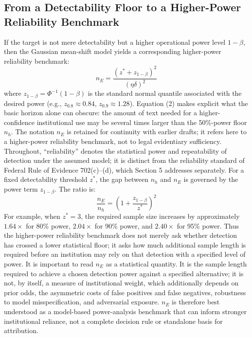 \documentclass[11pt]{article}
\begin{document}
\subsection{From a Detectability Floor to a Higher-Power Reliability Benchmark}
If the target is not mere detectability but a higher operational power level
$1-\beta$, then the Gaussian mean-shift model yields a corresponding higher-power
reliability benchmark:
\begin{equation}
n_E = \frac{(z^* + z_{1-\beta})^2}{(\eta\delta)^2}
\end{equation}
where $z_{1-\beta} = \Phi^{-1}(1-\beta)$ is the standard normal quantile associated
with the desired power (e.g., $z_{0.8} \approx 0.84$, $z_{0.9} \approx 1.28$).
Equation (2) makes explicit what the basic horizon alone can obscure: the amount of
text needed for a higher-confidence institutional use may be several times larger
than the 50\%-power floor $n_h$. The notation $n_E$ is retained for continuity with
earlier drafts; it refers here to a higher-power reliability benchmark, not to legal
evidentiary sufficiency. Throughout, ``reliability'' denotes the statistical power
and repeatability of detection under the assumed model; it is distinct from the
reliability standard of Federal Rule of Evidence 702(c)--(d), which Section 5
addresses separately.
For a fixed detectability threshold $z^*$, the gap between $n_h$ and $n_E$ is
governed by the power term $z_{1-\beta}$. The ratio is:
\begin{equation}
\frac{n_E}{n_h} = \left(1 + \frac{z_{1-\beta}}{z^*}\right)^2
\end{equation}
For example, when $z^* = 3$, the required sample size increases by approximately
$1.64\times$ for 80\% power, $2.04\times$ for 90\% power, and $2.40\times$ for 95\%
power. Thus the higher-power reliability benchmark does not merely ask whether
detection has crossed a lower statistical floor; it asks how much additional sample
length is required before an institution may rely on that detection with a
specified level of power.
It is important to read $n_E$ as a statistical quantity. It is the sample length
required to achieve a chosen detection power against a specified alternative; it is
not, by itself, a measure of institutional weight, which additionally depends on
prior odds, the asymmetric costs of false positives and false negatives, robustness
to model misspecification, and adversarial exposure. $n_E$ is therefore best
understood as a model-based power-analysis benchmark that can inform stronger
institutional reliance, not a complete decision rule or standalone basis for
attribution.
\end{document}
